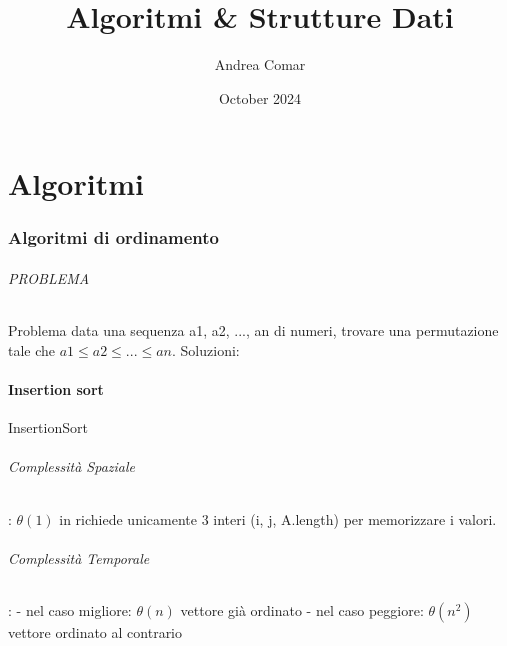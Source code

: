 \documentclass{article}
\title{Algoritmi \& Strutture Dati}
\author{Andrea Comar}
\date{October 2024}
\begin{document}
\maketitle
\newpage
\tableofcontents
\newpage
\part{Algoritmi}
\section{Algoritmi di ordinamento}
\paragraph{PROBLEMA} Problema data una sequenza a1, a2, ..., an di numeri, trovare una permutazione tale che 
$a1 \leq a2  \leq ... \leq an$. \newline
Soluzioni:
\subsection{Insertion sort}  %


    \begin{algorithm}[H] 
        \caption{InsertionSort\label{IR}}
        \end{algorithm}

\paragraph{Complessità Spaziale}: $\theta(1)$ in richiede unicamente 3 interi (i, j, A.length) 
per memorizzare i valori.

\paragraph{Complessità Temporale}: \newline
- nel caso migliore: $\theta(n)$ vettore già ordinato \newline
- nel caso peggiore: $\theta(n^2)$ vettore ordinato al contrario 
\end{document}
